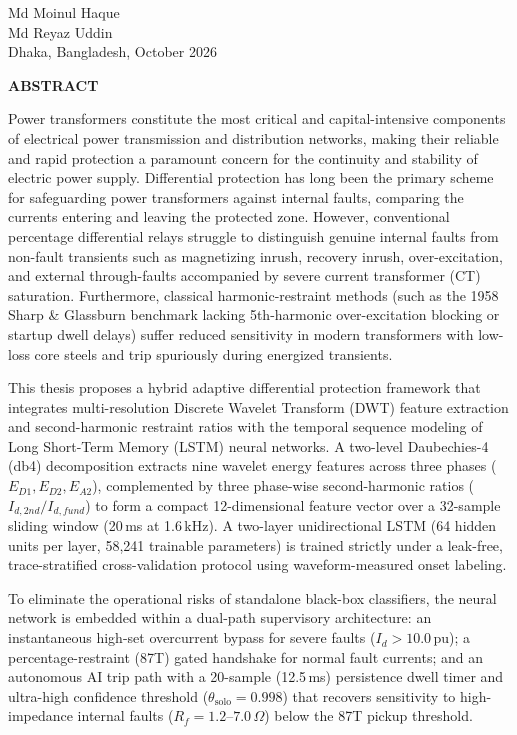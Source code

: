 \documentclass[12pt,a4paper,oneside]{report}
\newcommand{\frontchap}[1]{%
  \clearpage\phantomsection
  \begin{center}{\Large\bfseries\MakeUppercase{#1}}\end{center}\vspace{6pt}%
  \addcontentsline{toc}{chapter}{#1}}
\begin{document}
\vspace{0.4in}\par\noindent
Md Moinul Haque\\
Md Reyaz Uddin\\
Dhaka, Bangladesh, October 2026

\frontchap{ABSTRACT}
{\setlength{\parskip}{2.5pt}
Power transformers constitute the most critical and capital-intensive components of electrical power transmission and distribution networks, making their reliable and rapid protection a paramount concern for the continuity and stability of electric power supply. Differential protection has long been the primary scheme for safeguarding power transformers against internal faults, comparing the currents entering and leaving the protected zone. However, conventional percentage differential relays struggle to distinguish genuine internal faults from non-fault transients such as magnetizing inrush, recovery inrush, over-excitation, and external through-faults accompanied by severe current transformer (CT) saturation. Furthermore, classical harmonic-restraint methods (such as the 1958 Sharp \& Glassburn benchmark lacking 5th-harmonic over-excitation blocking or startup dwell delays) suffer reduced sensitivity in modern transformers with low-loss core steels and trip spuriously during energized transients.

This thesis proposes a hybrid adaptive differential protection framework that integrates multi-resolution Discrete Wavelet Transform (DWT) feature extraction and second-harmonic restraint ratios with the temporal sequence modeling of Long Short-Term Memory (LSTM) neural networks. A two-level Daubechies-4 (db4) decomposition extracts nine wavelet energy features across three phases ($E_{D1}, E_{D2}, E_{A2}$), complemented by three phase-wise second-harmonic ratios ($I_{d,2nd}/I_{d,fund}$) to form a compact 12-dimensional feature vector over a 32-sample sliding window (20\,ms at 1.6\,kHz). A two-layer unidirectional LSTM (64 hidden units per layer, 58{,}241 trainable parameters) is trained strictly under a leak-free, trace-stratified cross-validation protocol using waveform-measured onset labeling.

To eliminate the operational risks of standalone black-box classifiers, the neural network is embedded within a dual-path supervisory architecture: an instantaneous high-set overcurrent bypass for severe faults ($I_d > 10.0$\,pu); a percentage-restraint (87T) gated handshake for normal fault currents; and an autonomous AI trip path with a 20-sample (12.5\,ms) persistence dwell timer and ultra-high confidence threshold ($\theta_{\text{solo}} = 0.998$) that recovers sensitivity to high-impedance internal faults ($R_f = 1.2$--$7.0\,\Omega$) below the 87T pickup threshold.

}
\end{document}
